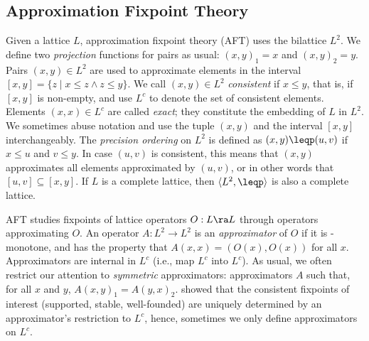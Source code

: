 \subsection{Approximation Fixpoint Theory}


Given a lattice $L$, approximation fixpoint theory (AFT) \cite{DeneckerMT00} uses the bilattice 
$L^2$.  We define two \emph{projection} functions for pairs as usual:
$(x,y)_1=x$ and $(x,y)_2=y$.  Pairs $(x,y)\in L^2$ are used to
approximate elements in the interval $[x,y] = \{z\mid x\leq
z\wedge z\leq y\}$. We call $(x,y)\in L^2$ \emph{consistent} if $x\leq 
y$, that is, if $[x,y]$ is non-empty, and use $L^c$ to denote the set
of consistent elements. Elements $(x,x) \in L^c$ are called
\emph{exact}; they constitute the embedding of $L$ in $L^2$.  We sometimes abuse notation and use the tuple $(x,y)$
and the interval $[x,y]$ interchangeably.  The \emph{precision
  ordering} on $L^2$ is defined as $(x,y) \leqp (u,v)$ if $x\leq u$
and $v\leq y$. In case $(u,v)$ is consistent, this means that $(x,y)$
approximates all elements approximated by $(u,v)$, or in other words
that $[u,v]\subseteq [x,y]$.  If $L$ is a complete lattice, then
$\langle L^2,\leqp\rangle$ is also a complete lattice.
  


AFT studies fixpoints of lattice operators $O:L\ra L$ through operators approximating $O$.
 An operator $A: L^2\to L^2$  is an \emph{approximator} of $O$ if it is \leqp-monotone,  and has the property that $A(x,x) = (O(x),O(x))$ for all $x$. %
Approximators are internal in $L^c$ (i.e., map $L^c$ into $L^c$).
As usual, we often restrict our attention to \emph{symmetric} approximators: approximators $A$ such that, for all $x$ and $y$, $A(x,y)_1 = A(y,x)_2$.
\citet{DeneckerMT04} showed that the consistent fixpoints of interest (supported, stable, well-founded) are uniquely determined by an approximator's restriction to $L^c$, hence, sometimes we only define approximators on $L^c$. 

